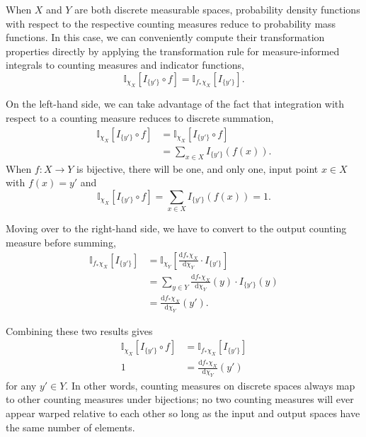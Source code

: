 \documentclass[
  letterpaper,
  DIV=11,
  numbers=noendperiod]{scrartcl}
\begin{document}
When \(X\) and \(Y\) are both discrete measurable spaces, probability
density functions with respect to the respective counting measures
reduce to probability mass functions. In this case, we can conveniently
compute their transformation properties directly by applying the
transformation rule for measure-informed integrals to counting measures
and indicator functions, \[
\mathbb{I}_{ \chi_{X} } [ I_{ \{ y' \} } \circ f ]
=
\mathbb{I}_{ f_{*} \chi_{X} } [ I_{ \{ y' \} } ].
\]

On the left-hand side, we can take advantage of the fact that
integration with respect to a counting measure reduces to discrete
summation, \begin{align*}
\mathbb{I}_{ \chi_{X} } [ I_{ \{ y' \} } \circ f ]
&=
\mathbb{I}_{\chi_{X}} \left[ I_{ \{ y' \} } \circ f \right]
\\
&=
\sum_{x \in X} I_{ \{ y' \} }(f(x)).
\end{align*} When \(f : X \rightarrow Y\) is bijective, there will be
one, and only one, input point \(x \in X\) with \(f(x) = y'\) and \[
\mathbb{I}_{ \chi_{X} } [ I_{ \{ y' \} } \circ f ]
=
\sum_{x \in X} I_{ \{ y' \} }(f(x))
=
1.
\]

Moving over to the right-hand side, we have to convert to the output
counting measure before summing, \begin{align*}
\mathbb{I}_{ f_{*} \chi_{X} } [ I_{ \{ y' \} } ]
&=
\mathbb{I}_{\chi_{Y}} \left[
\frac{ \mathrm{d} f_{*} \chi_{X} }{ \mathrm{d} \chi_{Y} }
\cdot I_{ \{ y' \} }
\right]
\\
&=
\sum_{y \in Y}
\frac{ \mathrm{d} f_{*} \chi_{X} }{ \mathrm{d} \chi_{Y} }(y)
\cdot I_{ \{ y' \} }(y)
\\
&=
\frac{ \mathrm{d} f_{*} \chi_{X} }{ \mathrm{d} \chi_{Y} }(y').
\end{align*}

Combining these two results gives \begin{align*}
\mathbb{I}_{ \chi_{X} } [ I_{ \{ y' \} } \circ f ]
&=
\mathbb{I}_{ f_{*} \chi_{X} } [ I_{ \{ y' \} } ]
\\
1
&=
\frac{ \mathrm{d} f_{*} \chi_{X} }{ \mathrm{d} \chi_{Y} }(y')
\end{align*} for any \(y' \in Y\). In other words, counting measures on
discrete spaces always map to other counting measures under bijections;
no two counting measures will ever appear warped relative to each other
so long as the input and output spaces have the same number of elements.
\end{document}
